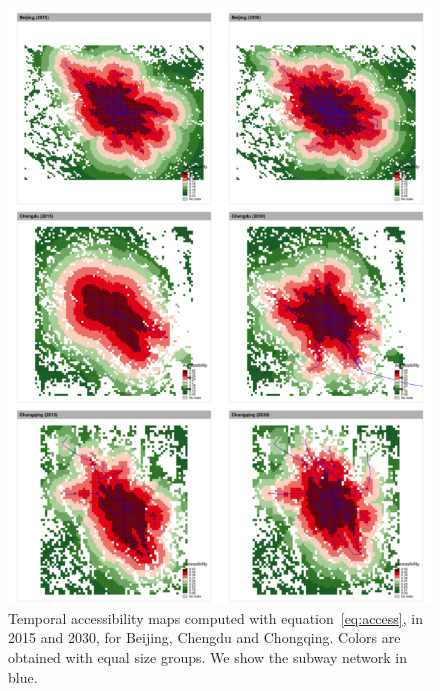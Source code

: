 \documentclass{article}
\begin{document}
\begin{figure}
	\includegraphics[width=\linewidth]{Fig1a.png}
	\caption{Temporal accessibility maps computed with equation~\ref{eq:access}, in 2015 and 2030, for Beijing, Chengdu and Chongqing. Colors are obtained with equal size groups. We show the subway network in blue.\label{fig:fig1}}
\end{figure}
\end{document}
